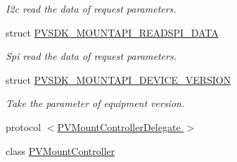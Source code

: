 \begin{DoxyCompactItemize}
\begin{DoxyCompactList}\small\item\em I2c read the data of request parameters. \end{DoxyCompactList}\item 
struct \hyperlink{struct_p_v_s_d_k___m_o_u_n_t_a_p_i___r_e_a_d_s_p_i___d_a_t_a}{P\+V\+S\+D\+K\+\_\+\+M\+O\+U\+N\+T\+A\+P\+I\+\_\+\+R\+E\+A\+D\+S\+P\+I\+\_\+\+D\+A\+TA}
\begin{DoxyCompactList}\small\item\em Spi read the data of request parameters. \end{DoxyCompactList}\item 
struct \hyperlink{struct_p_v_s_d_k___m_o_u_n_t_a_p_i___d_e_v_i_c_e___v_e_r_s_i_o_n}{P\+V\+S\+D\+K\+\_\+\+M\+O\+U\+N\+T\+A\+P\+I\+\_\+\+D\+E\+V\+I\+C\+E\+\_\+\+V\+E\+R\+S\+I\+ON}
\begin{DoxyCompactList}\small\item\em Take the parameter of equipment version. \end{DoxyCompactList}\item 
protocol \hyperlink{protocol_p_v_mount_controller_delegate_01-p}{$<$\+P\+V\+Mount\+Controller\+Delegate $>$}
\item 
class \hyperlink{interface_p_v_mount_controller}{P\+V\+Mount\+Controller}
\end{DoxyCompactItemize}
